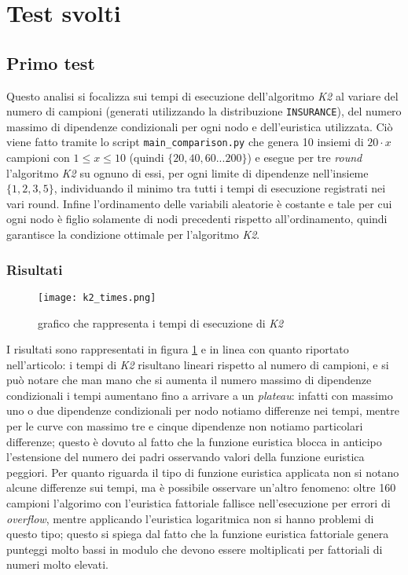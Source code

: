 \section{Test svolti}

\subsection{Primo test}

Questo analisi si focalizza sui tempi di esecuzione dell'algoritmo \textit{K2} al variare del
numero di campioni (generati utilizzando la distribuzione \texttt{INSURANCE}), del numero massimo
di dipendenze condizionali per ogni nodo e dell'euristica utilizzata. Ciò viene fatto tramite lo
script \texttt{main\_comparison.py} che genera 10 insiemi di $20 \cdot x$ campioni con $1 \le x \le
    10$ (quindi $\{20, 40, 60... 200\}$) e esegue per tre \textit{round} l'algoritmo \textit{K2} su
ognuno di essi, per ogni limite di dipendenze nell'insieme $\{1, 2, 3, 5\}$, individuando il minimo
tra tutti i tempi di esecuzione registrati nei vari round. Infine l'ordinamento delle variabili
aleatorie è costante e tale per cui ogni nodo è figlio solamente di nodi precedenti rispetto
all'ordinamento, quindi garantisce la condizione ottimale per l'algoritmo \textit{K2}.

\subsubsection{Risultati}

\begin{figure}[h]
    \centering
    \texttt{[image: k2\_times.png]}
    \caption{grafico che rappresenta i tempi di esecuzione di \textit{K2}}
    \label{fig:test1}
\end{figure}

I risultati sono rappresentati in figura \ref{fig:test1} e in linea con quanto riportato
nell'articolo\footnotemark[3]: i tempi di \textit{K2} risultano lineari rispetto al numero di
campioni, e si può notare che man mano che si aumenta il numero massimo di dipendenze condizionali
i tempi aumentano fino a arrivare a un \textit{plateau}: infatti con massimo uno o due dipendenze
condizionali per nodo notiamo differenze nei tempi, mentre per le curve con massimo tre e cinque
dipendenze non notiamo particolari differenze; questo è dovuto al fatto che la funzione euristica
blocca in anticipo l'estensione del numero dei padri osservando valori della funzione euristica
peggiori. Per quanto riguarda il tipo di funzione euristica applicata non si notano alcune
differenze sui tempi, ma è possibile osservare un'altro fenomeno: oltre 160 campioni l'algorimo con
l'euristica fattoriale fallisce nell'esecuzione per errori di \textit{overflow}, mentre applicando
l'euristica logaritmica non si hanno problemi di questo tipo; questo si spiega dal fatto che la
funzione euristica fattoriale genera punteggi molto bassi in modulo che devono essere moltiplicati
per fattoriali di numeri molto elevati.

